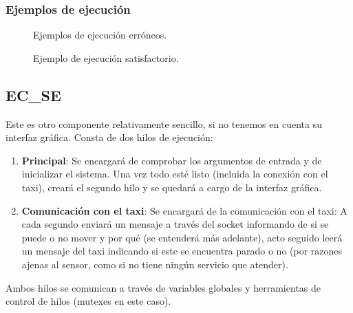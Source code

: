 \documentclass[a4paper,12pt]{article}
\begin{document}
\subsubsection{Ejemplos de ejecución}
\begin{figure}[h]
  \centering
  \caption{Ejemplos de ejecución erróneos.}
\end{figure}
\begin{figure}[h]
  \centering
  \caption{Ejemplo de ejecución satisfactorio.}
\end{figure}

\clearpage
\subsection{EC\_SE}
Este es otro componente relativamente sencillo, si no tenemos en cuenta su interfaz gráfica. Consta de dos hilos de ejecución:
\begin{enumerate}
  \item \textbf{Principal}: Se encargará de comprobar los argumentos de entrada y de inicializar el sistema. Una vez todo esté listo
        (incluida la conexión con el taxi), creará el segundo hilo y se quedará a cargo de la interfaz gráfica.
  \item \textbf{Comunicación con el taxi}: Se encargará de la comunicación con el taxi: A cada segundo enviará un mensaje
        a través del socket informando de si se puede o no mover y por qué (se entenderá más adelante), acto seguido leerá
        un mensaje del taxi indicando si este se encuentra parado o no (por razones ajenas al sensor, como si no tiene ningún servicio que atender).
\end{enumerate}
Ambos hilos se comunican a través de variables globales y herramientas de control de hilos (mutexes en este caso). \par
\end{document}
